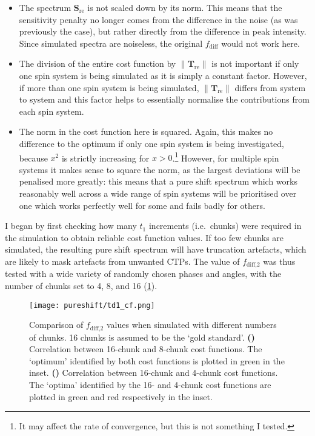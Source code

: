 \begin{itemize}
    \item The spectrum $\symbf{S}_\text{re}$ is not scaled down by its norm. This means that the sensitivity penalty no longer comes from the difference in the noise (as was previously the case), but rather directly from the difference in peak intensity.
        Since simulated spectra are noiseless, the original $f_\text{diff}$ would not work here.
    \item The division of the entire cost function by $\lVert\symbf{T}_\text{re}\rVert$ is not important if only one spin system is being simulated as it is simply a constant factor.
        However, if more than one spin system is being simulated, $\lVert\symbf{T}_\text{re}\rVert$ differs from system to system and this factor helps to essentially normalise the contributions from each spin system.
    \item The norm in the cost function here is squared.
        Again, this makes no difference to the optimum if only one spin system is being investigated, because $x^2$ is strictly increasing for $x > 0$.\footnote{It may affect the rate of convergence, but this is not something I tested.}
        However, for multiple spin systems it makes sense to square the norm, as the largest deviations will be penalised more greatly: this means that a pure shift spectrum which works reasonably well across a wide range of spin systems will be prioritised over one which works perfectly well for some and fails badly for others.
\end{itemize}

I began by first checking how many $t_1$ increments (i.e.\ chunks) were required in the simulation to obtain reliable cost function values.
If too few chunks are simulated, the resulting pure shift spectrum will have truncation artefacts, which are likely to mask artefacts from unwanted CTPs.
The value of $f_\text{diff,2}$ was thus tested with a wide variety of randomly chosen phases and angles, with the number of chunks set to 4, 8, and 16 (\cref{fig:dpsyche_td1_cf}).

\begin{figure}[htb]
    \centering
    \texttt{[image: pureshift/td1\_cf.png]}%
    {\label{fig:dpsyche_td1_cf_16_8}}%
    {\label{fig:dpsyche_td1_cf_16_4}}%
    \caption[Comparison of $f_\text{diff,2}$ cost function with different numbers of chunks]{
        Comparison of $f_\text{diff,2}$ values when simulated with different numbers of chunks.
        16 chunks is assumed to be the `gold standard'.
        \textbf{()} Correlation between 16-chunk and 8-chunk cost functions.
        The `optimum' identified by both cost functions is plotted in green in the inset.
        \textbf{()} Correlation between 16-chunk and 4-chunk cost functions.
        The `optima' identified by the 16- and 4-chunk cost functions are plotted in green and red respectively in the inset.
    }
    \label{fig:dpsyche_td1_cf}
\end{figure}

